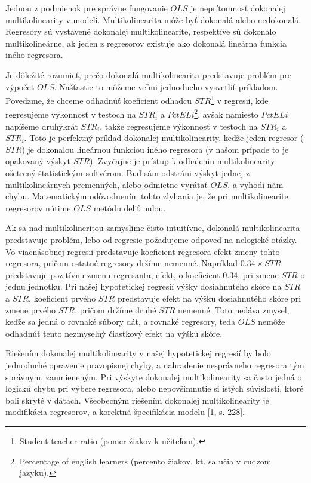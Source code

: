 \documentclass[]{tukediphc}
\begin{document}
Jednou z podmienok pre správne fungovanie $OLS$ je neprítomnosť dokonalej multikolinearity v modeli. Multikolinearita môže byť dokonalá alebo nedokonalá. Regresory sú vystavené dokonalej multikolinearite, respektíve sú dokonalo multikolineárne, ak jeden z regresorov existuje ako dokonalá lineárna funkcia iného regresora. 

Je dôležité rozumieť, prečo dokonalá multikolinearita predstavuje problém pre výpočet $OLS$. Našťastie to môžeme veľmi jednoducho vysvetliť príkladom. Povedzme, že chceme odhadnúť koeficient odhadcu $STR$\footnote{Student-teacher-ratio (pomer žiakov k učiteľom).} v regresii, kde regresujeme výkonnosť v testoch na $STR_i$ a $PctELi$\footnote{Percentage of english learners (percento žiakov, kt. sa učia v cudzom jazyku).}, avšak namiesto $PctELi$ napíšeme druhýkrát $STR_i$, takže regresujeme výkonnosť v testoch na $STR_i$ a $STR_i$. Toto je perfektný príklad dokonalej multikolinearity, keďže jeden regresor ($STR$) je dokonalou lineárnou funkciou iného regresora (v našom prípade to je opakovaný výskyt $STR$). Zvyčajne je prístup k odhaleniu multikolinearity ošetrený štatistickým softvérom. Buď sám odstráni výskyt jednej z multikolineárnych premenných, alebo odmietne vyrátať $OLS$, a vyhodí nám chybu. Matematickým odôvodnením tohto zlyhania je, že pri multikolinearite regresorov nútime $OLS$ metódu deliť nulou. 

Ak sa nad multikolineritou zamyslíme čisto intuitívne, dokonalá multikolinearita predstavuje problém, lebo od regresie požadujeme odpoveď na nelogické otázky. Vo viacnásobnej regresii predstavuje koeficient regresora efekt zmeny tohto regresora, pričom ostatné regresory držíme nemenné. Napríklad $0.34 \times STR$ predstavuje pozitívnu zmenu regresanta, efekt, o koeficient $0.34$, pri zmene $STR$ o jednu jednotku. Pri našej hypotetickej regresií výšky dosiahnutého skóre na $STR$ a $STR$, koeficient prvého $STR$ predstavuje efekt na výšku dosiahnutého skóre pri zmene prvého $STR$, pričom držíme druhé $STR$ nemenné. Toto nedáva zmysel, keďže sa jedná o rovnaké súbory dát, a rovnaké regresory, teda $OLS$ nemôže odhadnúť tento nezmyselný čiastkový efekt na výšku skóre. 

Riešením dokonalej multikolinearity v našej hypotetickej regresií by bolo jednoduché opravenie pravopisnej chyby, a nahradenie nesprávneho regresora tým správnym, zaumieneným. Pri výskyte dokonalej multikolinearity sa často jedná o logickú chybu pri výbere regresora, alebo nepovšimnutie si istých súvislostí, ktoré boli skryté v dátach. Všeobecným riešením dokonalej multikolinearity je modifikácia regresorov, a korektná špecifikácia modelu [1, s. 228]. 
\end{document}

